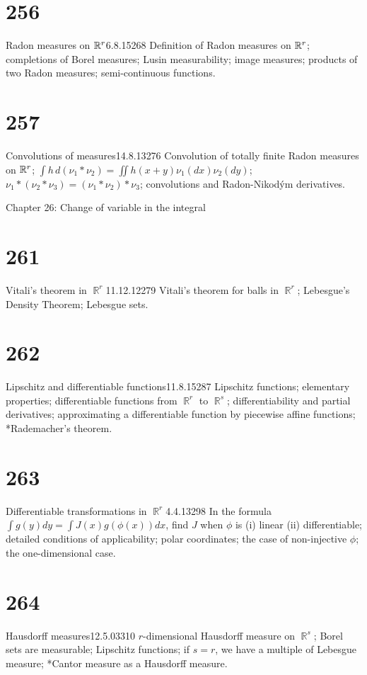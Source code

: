\section{256}{Radon measures on $\Bbb{R}^r$}{6.8.15}{268}{}
{Definition of Radon measures on $\Bbb{R}^r$;  completions of Borel
measures;  Lusin measurability;  image measures;
products of two Radon measures;  semi-continuous functions.}

\section{257}{Convolutions of measures}{14.8.13}{276}{}
{Convolution of totally finite Radon measures on $\Bbb{R}^r$;
${\int}h\,d(\nu_1*\nu_2)={\iint}h(x+y)\nu_1(dx)\nu_2(dy)$;
$\nu_1*(\nu_2*\nu_3)=(\nu_1*\nu_2)*\nu_3$;  convolutions and
Radon-Nikod\'ym derivatives.}


 Chapter 26:  Change of variable in the integral


\section{261}{Vitali's theorem in $\BbbR^r$}{11.12.12}{279}{}
{Vitali's theorem for balls in $\BbbR^r$;  Lebesgue's Density
Theorem;  Lebesgue sets.}

\section{262}{Lipschitz and differentiable functions}{11.8.15}{287}{}
{Lipschitz functions;  elementary properties;  differentiable
functions from $\BbbR^r$ to $\BbbR^s$;  differentiability and partial
derivatives;  approximating a differentiable function by piecewise 
affine functions;  *Rademacher's theorem.}

\section{263}{Differentiable transformations in $\BbbR^r$}{4.4.13}{298}{}
{In the formula ${\int}g(y)dy={\int}J(x)g(\phi(x))dx$, find $J$ when
$\phi$ is (i) linear (ii) differentiable;  detailed conditions of
applicability;  polar coordinates;  the case of non-injective $\phi$;
the one-dimensional case.}

\section{264}{Hausdorff measures}{12.5.03}{310}{}
{$r$-dimensional Hausdorff measure on $\BbbR^s$;  Borel sets are
measurable;  Lipschitz functions;  if $s=r$, we have a multiple of
Lebesgue measure;  *Cantor measure as a Hausdorff measure.}

